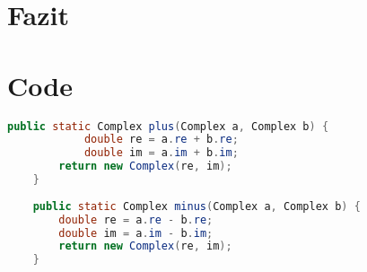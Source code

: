 \documentclass[12pt]{article}
\begin{document}
\section{Fazit}

\section{Code}

\begin{lstlisting}[language=Java, title={Complex.java: Z. 19-29}]
    public static Complex plus(Complex a, Complex b) {
            double re = a.re + b.re;
            double im = a.im + b.im;
        return new Complex(re, im);
    }
    
    public static Complex minus(Complex a, Complex b) {
        double re = a.re - b.re;
        double im = a.im - b.im;
        return new Complex(re, im);
    }
    \end{lstlisting}
    
\end{document}
